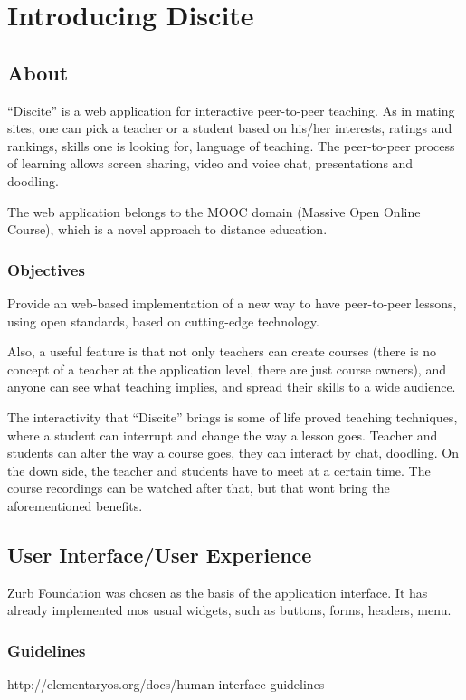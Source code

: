 
\chapter{Introducing Discite}

\section{About}
``Discite'' is a web application for interactive peer-to-peer
teaching. As in mating sites, one can pick a teacher or a student based on
his/her interests, ratings and rankings, skills one is looking for, language of
teaching. The peer-to-peer process of learning allows screen sharing, video and
voice chat, presentations and doodling.

The web application belongs to the MOOC domain (Massive Open Online Course),
which is a novel approach to distance education.

\subsection{Objectives}
Provide an web-based implementation of a new way to have peer-to-peer lessons,
using open standards, based on cutting-edge technology.

Also, a useful feature is that not only teachers can create courses
(there is no concept of a teacher at the application level, there are just
course owners), and anyone can see what teaching implies, and spread their
skills to a wide audience.

The interactivity that ``Discite'' brings is some of life proved teaching
techniques, where a student can interrupt and change the way a lesson goes.
Teacher and students can alter the way a course goes, they can interact by chat,
doodling.
On the down side, the teacher and students have to meet at a certain time. The
course recordings can be watched after that, but that wont bring the
aforementioned benefits.


\section{User Interface/User Experience}
Zurb Foundation was chosen as the basis of the application interface. It has
already implemented mos usual widgets, such as buttons, forms, headers, menu.
\subsection{Guidelines}
http://elementaryos.org/docs/human-interface-guidelines

